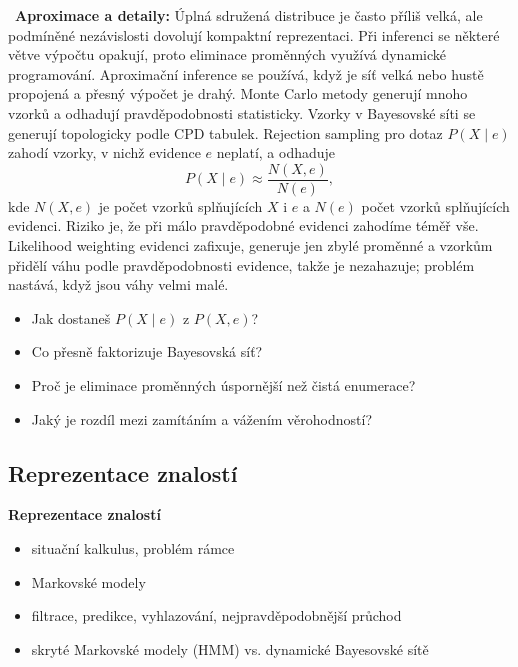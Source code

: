 \begin{odpoved}
\noindent{}\ \textbf{Aproximace a detaily:} Úplná sdružená distribuce je často příliš velká, ale podmíněné nezávislosti dovolují kompaktní reprezentaci. Při inferenci se některé větve výpočtu opakují, proto eliminace proměnných využívá dynamické programování. Aproximační inference se používá, když je síť velká nebo hustě propojená a přesný výpočet je drahý. Monte Carlo metody generují mnoho vzorků a odhadují pravděpodobnosti statisticky. Vzorky v Bayesovské síti se generují topologicky podle CPD tabulek. Rejection sampling pro dotaz $P(X\mid e)$ zahodí vzorky, v nichž evidence $e$ neplatí, a odhaduje
\[
P(X\mid e)\approx \frac{N(X,e)}{N(e)},
\]
kde $N(X,e)$ je počet vzorků splňujících $X$ i $e$ a $N(e)$ počet vzorků splňujících evidenci. Riziko je, že při málo pravděpodobné evidenci zahodíme téměř vše. Likelihood weighting evidenci zafixuje, generuje jen zbylé proměnné a vzorkům přidělí váhu podle pravděpodobnosti evidence, takže je nezahazuje; problém nastává, když jsou váhy velmi malé.
\end{odpoved}

\begin{recall}
\begin{itemize}[leftmargin=1.2em,itemsep=0pt,topsep=1pt]
  \item Jak dostaneš $P(X\mid e)$ z $P(X,e)$?
  \item Co přesně faktorizuje Bayesovská síť?
  \item Proč je eliminace proměnných úspornější než čistá enumerace?
  \item Jaký je rozdíl mezi zamítáním a vážením věrohodností?
\end{itemize}
\end{recall}

\subsection{Reprezentace znalostí}

\begin{tema}
\textbf{Reprezentace znalostí}
\begin{itemize}[leftmargin=1.2em,itemsep=0pt,topsep=1pt]
  \item situační kalkulus, problém rámce
  \item Markovské modely
  \item filtrace, predikce, vyhlazování, nejpravděpodobnější průchod
  \item skryté Markovské modely (HMM) vs. dynamické Bayesovské sítě
\end{itemize}
\end{tema}
\begin{vezkratce}
\end{vezkratce}

